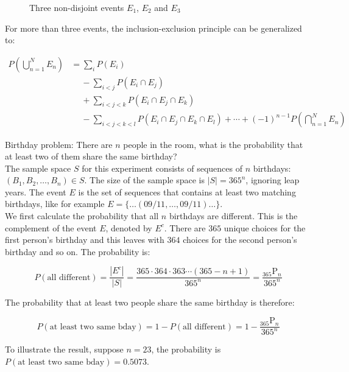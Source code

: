\begin{enumerate}[i]
	\begin{figure}[H]
		\centering
		\caption{Three non-disjoint events $E_1$, $E_2$ and $E_3$}
	\end{figure}
	
	For more than three events, the inclusion-exclusion principle can be generalized to:
	
	\begin{align*}
		P\left( \bigcup_{n=1}^N E_n \right) &= \sum_{i} P(E_i) \\
		&\phantom{-} - \sum_{i<j} P(E_i \cap E_j) \\
		&\phantom{-} + \sum_{i<j<k} P(E_i \cap E_j \cap E_k) \\
		&\phantom{-} - \sum_{i<j<k<l} P(E_i \cap E_j \cap E_k \cap E_l) + \cdots + (-1)^{n-1} P\left( \bigcap_{n=1}^N E_n \right)
	\end{align*}
\end{enumerate}

\begin{texample}
	Birthday problem: There are $n$ people in the room, what is the probability that at least two of them share the same birthday? \\
	
	The sample space $S$ for this experiment consists of sequences of $n$ birthdays: $(B_1, B_2, \dots, B_n) \in S$. The size of the sample space is $|S|=365^n$, ignoring leap years. The event $E$ is the set of sequences that contains at least two matching birthdays, like for example $E=\{\dots (09/11, \dots, 09/11) \dots\}$. \\
	
	We first calculate the probability that all $n$ birthdays are different. This is the complement of the event $E$, denoted by $E^c$. There are $365$ unique choices for the first person's birthday and this leaves with $364$ choices for the second person's birthday and so on. The probability is:
	
	$$ P(\text{all different})=\frac{|E^c|}{|S|}=\frac{365 \cdot 364 \cdot 363 \cdots (365-n+1)}{365^n}=\frac{{}_{365} \mathrm{P}_n}{365^n}$$
	
	The probability that at least two people share the same birthday is therefore:
	
	$$P(\text{at least two same bday})=1-P(\text{all different})=1-\frac{{}_{365} \mathrm{P}_n}{365^n}$$
	
	To illustrate the result, suppose $n=23$, the probability is $P(\text{at least two same bday})=0.5073$.
\end{texample}


